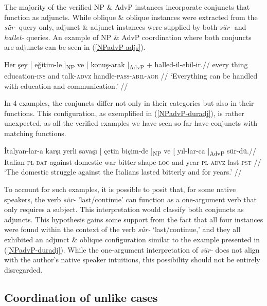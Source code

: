 The majority of the verified NP \& AdvP instances incorporate conjuncts that function as adjuncts. While oblique \& oblique instances were extracted from the \textit{sür-} query only, adjunct \& adjunct instances were supplied by both \textit{sür-} and \textit{hallet-} queries. An example of NP \& AdvP coordination where both conjuncts are adjuncts can be seen in (\ref{NPadvP-adjs}).

\pex[glspace=!1em,everygla={},everyglb={},aboveglbskip=-.15ex, interpartskip=15pt]
\label{NPadvP-adjs} \begingl
\gla Her şey {[} {eğitim-le ]\textsubscript{NP}} ve {[} {konuş-arak ]\textsubscript{AdvP}} + halled-il-ebil-ir.//
\glb every thing education-\textsc{ins} and talk-\textsc{advz} handle-\textsc{pass}-\textsc{abil}-\textsc{aor} //
\glft `Everything can be handled with education and communication.' //
\endgl
\xe

In 4 examples, the conjuncts differ not only in their categories but also in their functions. This configuration, as exemplified in (\ref{NPadvP-duradj}), is rather unexpected, as all the verified examples we have seen so far have conjuncts with matching functions.

\pex[glspace=!1em,everygla={},everyglb={},aboveglbskip=-.15ex, interpartskip=15pt]
\label{NPadvP-duradj} \begingl
\gla İtalyan-lar-a karşı yerli savaşı {[} çetin {biçim-de ]\textsubscript{NP}} ve {[} {yıl-lar-ca ]\textsubscript{AdvP}} sür-dü.//
\glb Italian-\textsc{pl}-\textsc{dat} against domestic war bitter shape-\textsc{loc} and year-\textsc{pl}-\textsc{advz} last-\textsc{pst} //
\glft `The domestic struggle against the Italians lasted bitterly and for years.' //
\endgl
\xe 

To account for such examples, it is possible to posit that, for some native speakers, the verb \textit{sür-} 'last/continue' can function as a one-argument verb that only requires a subject. This interpretation would classify both conjuncts as adjuncts. This hypothesis gains some support from the fact that all four instances were found within the context of the verb \textit{sür-} `last/continue,' and they all exhibited an adjunct \& oblique configuration similar to the example presented in (\ref{NPadvP-duradj}). While the one-argument interpretation of \textit{sür-} does not align with the author's native speaker intuitions, this possibility should not be entirely disregarded.

\subsection{Coordination of unlike cases}

